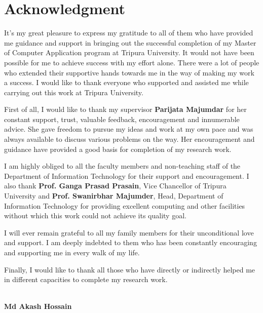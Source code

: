 \sloppy
\chapter*{\centering Acknowledgment}
It's my great pleasure to express my gratitude to all of them who have provided me guidance and support in bringing out the successful completion of my Master of Computer Application program at Tripura University. It would not have been possible for me to achieve success with my effort alone. There were a lot of people who extended their supportive hands towards me in the way of making my work a success. I would like to thank everyone who supported and assisted me while carrying out this work at Tripura University.

\noindent First of all, I would like to thank my supervisor {\bf Parijata Majumdar} for her constant support, trust, valuable feedback, encouragement and innumerable advice. She gave freedom to pursue my ideas and work at my own pace and was always available to discuss various problems on the way. Her encouragement and guidance have provided a good basis for completion of my research work.

\noindent I am highly obliged to all the faculty members and non-teaching staff of the Department of Information Technology for their support and encouragement. I also thank {\bf Prof. Ganga Prasad Prasain}, Vice Chancellor of Tripura University and {\bf Prof. Swanirbhar Majumder}, Head, Department of Information Technology for providing excellent computing and other facilities without which this work could not achieve its quality goal.

\noindent I will ever remain grateful to all my family members for their unconditional love and support. I am deeply indebted to them who has been constantly encouraging and supporting me in every walk of my life.

\noindent Finally, I would like to thank all those who have directly or indirectly helped me in different capacities to complete my research work. \\ \\
\begin{flushright}
{\bf Md Akash Hossain}
\end{flushright}
